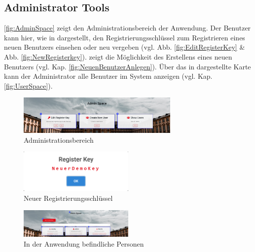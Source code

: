 \subsection{Administrator Tools}
\label{ssec:AdministratorTools}

\abb \vref{fig:AdminSpace} zeigt den Administrationsbereich der Anwendung. 
Der Benutzer kann hier, wie in \desOne dargestellt, den Registrierungsschlüssel zum Registrieren eines neuen Benutzers einsehen oder neu vergeben (vgl. Abb. \vref{fig:EditRegisterKey} \& Abb. \vref{fig:NewRegisterkey}). \newline
\desTwo zeigt die Möglichkeit des Erstellens eines neuen Benutzers (vgl. Kap. \vref{fig:NeuenBenutzerAnlegen}). 
Über das in \desThree dargestellte Karte kann der Administrator alle Benutzer im System anzeigen (vgl. Kap. \vref{fig:UserSpace}).

\begin{figure}[H]
	\centering
	\includegraphics[width=0.70\textwidth, keepaspectratio]{img/guide/AdminSpace.png}
	\captionsetup{justification=centering, format=plain}
	\caption[Administrationsbereich]{Administrationsbereich \\\quelleScreenshot}
	\label{fig:AdminSpace}
\end{figure}

\begin{figure}[H]
	\centering
	\includegraphics[width=0.5\textwidth, keepaspectratio]{img/guide/RegisterKey.png}
	\captionsetup{justification=centering, format=plain}
	\caption[Neuer Registrierungsschlüssel]{Neuer Registrierungsschlüssel \\\quelleScreenshot}
	\label{fig:NewRegisterkey}
\end{figure}

\begin{figure}[H]
	\centering
	\includegraphics[width=0.5\textwidth, keepaspectratio]{img/guide/UserSpace.png}
	\captionsetup{justification=centering, format=plain}
	\caption[In der Anwendung befindliche Personen]{In der Anwendung befindliche Personen \\\quelleScreenshot}
	\label{fig:UserSpace}
\end{figure}

